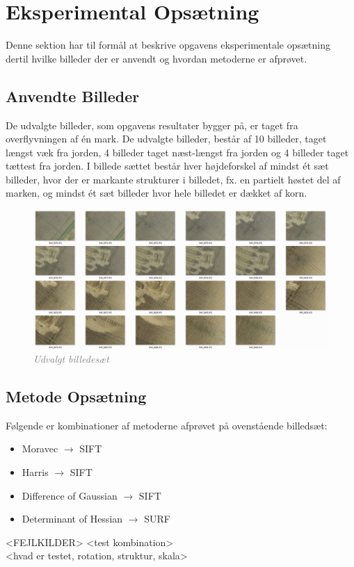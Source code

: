 \chapter{Eksperimental Opsætning}
Denne sektion har til formål at beskrive opgavens eksperimentale opsætning dertil hvilke billeder der er anvendt og hvordan metoderne er afprøvet.
\section{Anvendte Billeder}
De udvalgte billeder, som opgavens resultater bygger på, er taget fra overflyvningen af én mark. De udvalgte billeder, består af 10 billeder, taget længst væk fra jorden, 4 billeder taget næst-længst fra jorden og 4 billeder taget tættest fra jorden. I billede sættet består hver højdeforskel af mindst ét sæt billeder, hvor der er markante strukturer i billedet, fx. en partielt høstet del af marken, og mindst ét sæt billeder hvor hele billedet er dækket af korn.
\begin{figure}[H]
    \centering
    \includegraphics[width=1\textwidth]{fig/43a.png}
    \vspace{-0.5em}   
    \begin{center}
    \caption{\textcolor{gray}{\footnotesize \textit{Udvalgt billedesæt}}}
    \label{fig:lindblob}
     \end{center}
  \end{figure}
       \vspace{-2.7em}
\noindent
\section{Metode Opsætning}
Følgende er kombinationer af metoderne afprøvet på ovenstående billedsæt:
\begin{itemize}
\item{Moravec $\rightarrow$ SIFT}
\item{Harris $\rightarrow$ SIFT}
\item{Difference of Gaussian $\rightarrow$ SIFT}
\item{Determinant of Hessian $\rightarrow$ SURF}
\end{itemize}
<FEJLKILDER>
<test kombination> \\
<hvad er testet, rotation, struktur, skala>